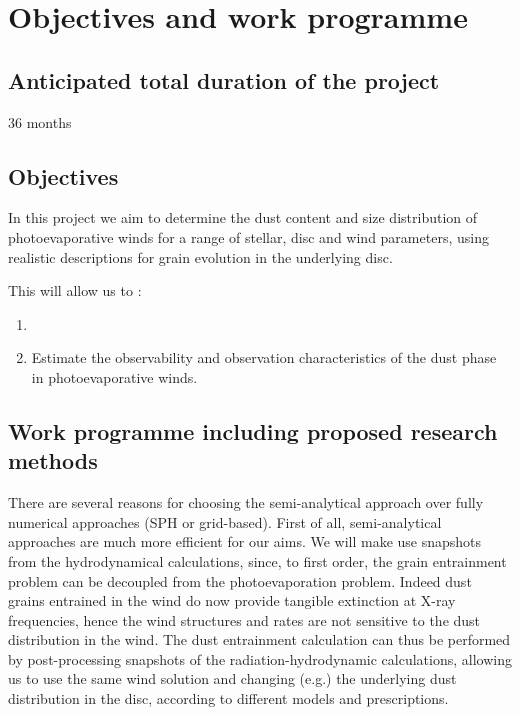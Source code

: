 \documentclass[10pt,fleqn,twoside]{article}
\begin{document}
\section{Objectives and work programme}
\renewcommand{\leftmark}{\sc Objectives and work programme}

\subsection{Anticipated total duration of the project}

36 months

\subsection{Objectives}
In this project
we aim to determine the dust content and size distribution of photoevaporative winds for a range of stellar, disc and wind parameters,
using realistic descriptions for grain evolution in the underlying
disc. 

This will allow us to : 
\begin{enumerate}
\item {}
\item Estimate the observability and observation characteristics of
the dust phase in photoevaporative winds.
\end{enumerate}

\subsection{Work programme including proposed research methods}


There are several reasons for choosing the semi-analytical approach
over fully numerical approaches (SPH or grid-based). First of all,
semi-analytical 
approaches are much more efficient for our aims. We will make
use snapshots from the hydrodynamical calculations, since, to first
order, the grain entrainment problem can be decoupled from the photoevaporation 
problem. Indeed 
dust grains entrained in the wind do now provide tangible extinction
at X-ray frequencies, hence the wind structures and rates are
not sensitive to the dust distribution in the wind. The dust
entrainment calculation can thus be performed by
post-processing snapshots of the radiation-hydrodynamic calculations,
allowing us
to use the same wind solution and changing (e.g.) the underlying dust
distribution in the disc, according to different models and
prescriptions. 
\end{document}
